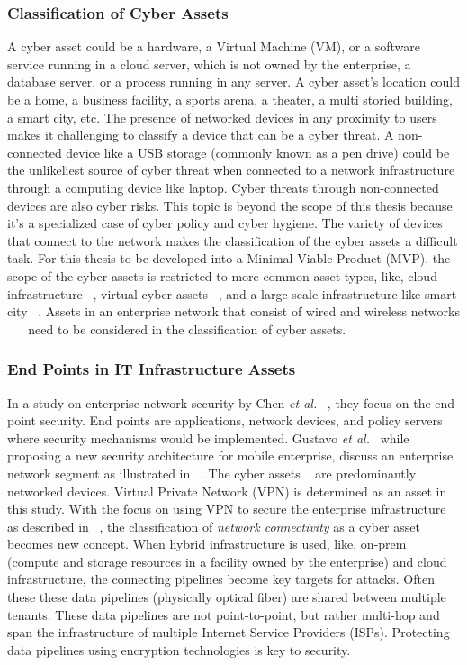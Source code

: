 \subsubsection{Classification of Cyber Assets}\label{sec:asset_class}
A cyber asset could be a hardware, a Virtual Machine (VM), or a software service running in a cloud server, which is not owned by the enterprise, a database server, or a process running in any server. A cyber asset's location could be a home, a business facility, a sports arena, a theater, a multi storied building, a smart city, etc. The presence of networked devices in any proximity to users makes it challenging to classify a device that can be a cyber threat. A non-connected device like a USB storage (commonly known as a pen drive) could be the unlikeliest source of cyber threat when connected to a network infrastructure through a computing device like laptop. Cyber threats through non-connected devices are also cyber risks. This topic is beyond the scope of this thesis because it's a specialized case of cyber policy and cyber hygiene. The variety of devices that connect to the network makes the classification of the cyber assets a difficult task. For this thesis to be developed into a Minimal Viable Product (MVP), the scope of the cyber assets is restricted to more common asset types, like, cloud infrastructure ~\cite{7145073}, virtual cyber assets ~\cite{4908498}, and a large scale infrastructure like smart city ~\cite{7580812}. Assets in an enterprise network that consist of wired and wireless networks ~\cite{5375916} ~\cite{6222759} need to be considered in the classification of cyber assets. \\

\subsubsection{End Points in IT Infrastructure Assets} \label{sec:ep_sec}
In a study on enterprise network security by Chen \textit{et al.} ~\cite{5375916}, they focus on the end point security. End points are applications, network devices, and policy servers where security mechanisms would be implemented. Gustavo \textit{et al.}~\cite{6222759} while proposing a new security architecture for mobile enterprise, discuss an enterprise network segment as illustrated in ~\cite[Figure 1, 2]{6222759}. The cyber assets ~\cite{6222759} are predominantly networked devices. Virtual Private Network (VPN) is determined as an asset in this study. With the focus on using VPN to secure the enterprise infrastructure as described in ~\cite{6222759}, the classification of \textit{network connectivity} as a cyber asset becomes new concept. When hybrid infrastructure is used, like, on-prem (compute and storage resources in a facility owned by the enterprise) and cloud infrastructure, the connecting pipelines become key targets for attacks. Often these these data pipelines (physically optical fiber) are shared between multiple tenants. These data pipelines are not point-to-point, but rather multi-hop and span the infrastructure of multiple Internet Service Providers (ISPs). Protecting data pipelines using encryption technologies is key to security. \\

